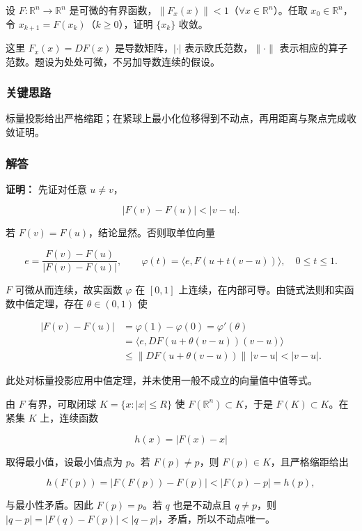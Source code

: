 \documentclass[11pt,a4paper]{article}
\begin{document}
设 \(F:\mathbb R^n\to\mathbb R^n\)
是可微的有界函数，\(\|F_x(x)\|<1\)（\(\forall x\in\mathbb R^n\)）。任取
\(x_0\in\mathbb R^n\)，令 \(x_{k+1}=F(x_k)\)（\(k\ge0\)），证明
\(\{x_k\}\) 收敛。

这里 \(F_x(x)=DF(x)\) 是导数矩阵，\(|\cdot|\)
表示欧氏范数，\(\|\cdot\|\)
表示相应的算子范数。题设为处处可微，不另加导数连续的假设。

\subsubsection{关键思路}\label{ux5173ux952eux601dux8def-15}

标量投影给出严格缩距；在紧球上最小化位移得到不动点，再用距离与聚点完成收敛证明。

\subsubsection{解答}\label{ux89e3ux7b54-15}

\textbf{证明：} 先证对任意 \(u\ne v\)，

\[
|F(v)-F(u)|<|v-u|.
\]

若 \(F(v)=F(u)\)，结论显然。否则取单位向量

\[
e=\frac{F(v)-F(u)}{|F(v)-F(u)|},
\qquad
\varphi(t)=\langle e,F(u+t(v-u))\rangle,\quad 0\le t\le1.
\]

\(F\) 可微从而连续，故实函数 \(\varphi\) 在 \([0,1]\)
上连续，在内部可导。由链式法则和实函数中值定理，存在 \(\theta\in(0,1)\)
使

\[
\begin{aligned}
|F(v)-F(u)|
&=\varphi(1)-\varphi(0)=\varphi'(\theta)\\
&=\langle e,DF(u+\theta(v-u))(v-u)\rangle\\
&\le\|DF(u+\theta(v-u))\|\,|v-u|<|v-u|.
\end{aligned}
\]

此处对标量投影应用中值定理，并未使用一般不成立的向量值中值等式。

由 \(F\) 有界，可取闭球 \(K=\{x:|x|\le R\}\) 使
\(F(\mathbb R^n)\subset K\)，于是 \(F(K)\subset K\)。在紧集 \(K\)
上，连续函数

\[
h(x)=|F(x)-x|
\]

取得最小值，设最小值点为 \(p\)。若 \(F(p)\ne p\)，则
\(F(p)\in K\)，且严格缩距给出

\[
h(F(p))=|F(F(p))-F(p)|<|F(p)-p|=h(p),
\]

与最小性矛盾。因此 \(F(p)=p\)。若 \(q\) 也是不动点且 \(q\ne p\)，则
\(|q-p|=|F(q)-F(p)|<|q-p|\)，矛盾，所以不动点唯一。
\end{document}
